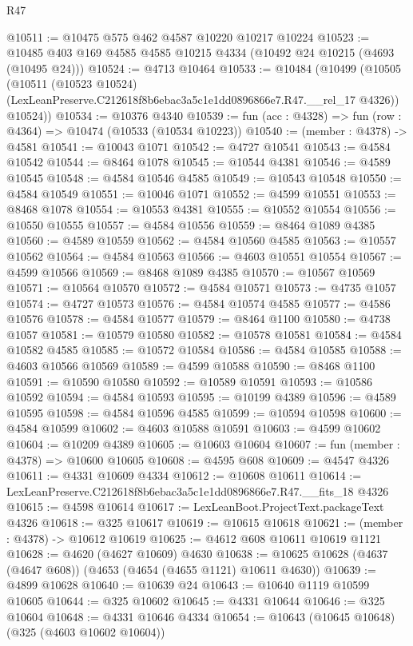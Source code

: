 \begin{lexlean}{R47}
\begin{coremodule}
@10511 := @10475 @575 @462 @4587 @10220 @10217 @10224
@10523 := @10485 @403 @169 @4585 @4585 @10215 @4334 (@10492 @24 @10215 (@4693 (@10495 @24)))
@10524 := @4713 @10464
@10533 := @10484
    (@10499
      (@10505
        (@10511
          (@10523 @10524)
          (LexLeanPreserve.C212618f8b6ebac3a5c1e1dd0896866e7.R47.__rel_17 @4326))
        @10524))
@10534 := @10376 @4340
@10539 := fun (acc : @4328) => fun (row : @4364) => @10474 (@10533 (@10534 @10223))
@10540 := (member : @4378) -> @4581
@10541 := @10043 @1071
@10542 := @4727 @10541
@10543 := @4584 @10542
@10544 := @8464 @1078
@10545 := @10544 @4381
@10546 := @4589 @10545
@10548 := @4584 @10546 @4585
@10549 := @10543 @10548
@10550 := @4584 @10549
@10551 := @10046 @1071
@10552 := @4599 @10551
@10553 := @8468 @1078
@10554 := @10553 @4381
@10555 := @10552 @10554
@10556 := @10550 @10555
@10557 := @4584 @10556
@10559 := @8464 @1089 @4385
@10560 := @4589 @10559
@10562 := @4584 @10560 @4585
@10563 := @10557 @10562
@10564 := @4584 @10563
@10566 := @4603 @10551 @10554
@10567 := @4599 @10566
@10569 := @8468 @1089 @4385
@10570 := @10567 @10569
@10571 := @10564 @10570
@10572 := @4584 @10571
@10573 := @4735 @1057
@10574 := @4727 @10573
@10576 := @4584 @10574 @4585
@10577 := @4586 @10576
@10578 := @4584 @10577
@10579 := @8464 @1100
@10580 := @4738 @1057
@10581 := @10579 @10580
@10582 := @10578 @10581
@10584 := @4584 @10582 @4585
@10585 := @10572 @10584
@10586 := @4584 @10585
@10588 := @4603 @10566 @10569
@10589 := @4599 @10588
@10590 := @8468 @1100
@10591 := @10590 @10580
@10592 := @10589 @10591
@10593 := @10586 @10592
@10594 := @4584 @10593
@10595 := @10199 @4389
@10596 := @4589 @10595
@10598 := @4584 @10596 @4585
@10599 := @10594 @10598
@10600 := @4584 @10599
@10602 := @4603 @10588 @10591
@10603 := @4599 @10602
@10604 := @10209 @4389
@10605 := @10603 @10604
@10607 := fun (member : @4378) => @10600 @10605
@10608 := @4595 @608
@10609 := @4547 @4326
@10611 := @4331 @10609 @4334
@10612 := @10608 @10611
@10614 := LexLeanPreserve.C212618f8b6ebac3a5c1e1dd0896866e7.R47.__fits_18 @4326
@10615 := @4598 @10614
@10617 := LexLeanBoot.ProjectText.packageText @4326
@10618 := @325 @10617
@10619 := @10615 @10618
@10621 := (member : @4378) -> @10612 @10619
@10625 := @4612 @608 @10611 @10619 @1121
@10628 := @4620 (@4627 @10609) @4630
@10638 := @10625 @10628 (@4637 (@4647 @608)) (@4653 (@4654 (@4655 @1121) @10611 @4630))
@10639 := @4899 @10628
@10640 := @10639 @24
@10643 := @10640 @1119 @10599 @10605
@10644 := @325 @10602
@10645 := @4331 @10644
@10646 := @325 @10604
@10648 := @4331 @10646 @4334
@10654 := @10643 (@10645 @10648) (@325 (@4603 @10602 @10604))

\end{coremodule}
\end{lexlean}
